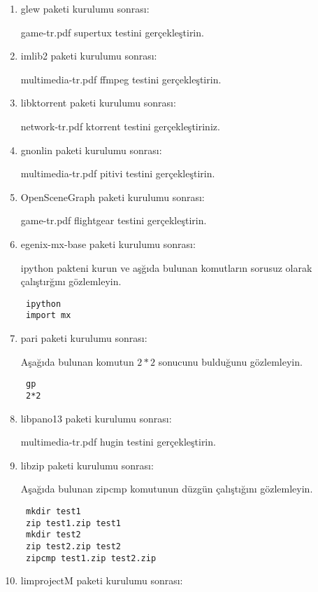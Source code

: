 \documentclass[a4paper,10pt]{article}
\begin{document}
\begin{enumerate}
\item glew paketi kurulumu sonrası:

game-tr.pdf supertux testini gerçekleştirin.

\item imlib2 paketi kurulumu sonrası:

multimedia-tr.pdf ffmpeg testini gerçekleştirin.

\item libktorrent paketi kurulumu sonrası:

network-tr.pdf ktorrent testini gerçekleştiriniz.

\item gnonlin paketi kurulumu sonrası:

multimedia-tr.pdf pitivi testini gerçekleştirin.

\item OpenSceneGraph paketi kurulumu sonrası:

game-tr.pdf flightgear testini gerçekleştirin.

\item egenix-mx-base paketi kurulumu sonrası:

ipython pakteni kurun ve aşğıda bulunan komutların sorusuz olarak çalıştırğını gözlemleyin.

\begin{verbatim}
 ipython
 import mx
\end{verbatim}


\item pari paketi kurulumu sonrası:

Aşağıda bulunan komutun $2*2$ sonucunu bulduğunu gözlemleyin.
\begin{verbatim}
 gp 
 2*2
\end{verbatim}

\item libpano13 paketi kurulumu sonrası:
  
multimedia-tr.pdf hugin testini gerçekleştirin.

\item libzip paketi kurulumu sonrası:

Aşağıda bulunan zipcmp komutunun düzgün çalıştığını gözlemleyin.
\begin{verbatim}
 mkdir test1
 zip test1.zip test1
 mkdir test2
 zip test2.zip test2
 zipcmp test1.zip test2.zip
\end{verbatim}

\item limprojectM paketi kurulumu sonrası:
  

\end{enumerate}
\end{document}
